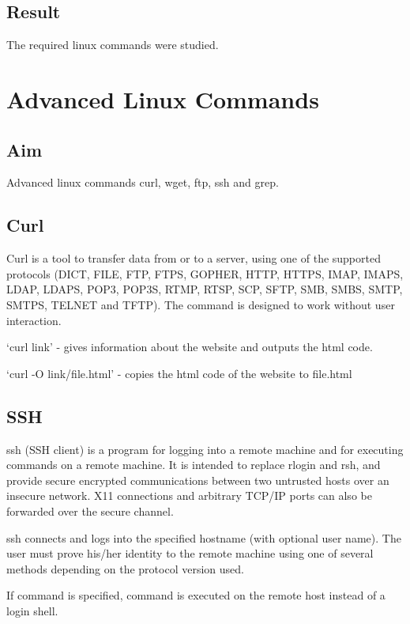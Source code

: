 \documentclass{article}
\begin{document}
\subsection {Result}

The required linux commands were studied.

\newpage
\section{Advanced Linux Commands}

\subsection{Aim}
Advanced linux commands curl, wget, ftp, ssh and grep.

\subsection{Curl}

Curl is a tool to transfer data from or to a server, using one of the supported protocols (DICT, FILE, FTP, FTPS, GOPHER, HTTP, HTTPS, IMAP, IMAPS, LDAP, LDAPS, POP3, POP3S, RTMP, RTSP, SCP, SFTP, SMB, SMBS, SMTP, SMTPS, TELNET and TFTP). The command is designed to work without user interaction.

`curl link' - gives information about the website and outputs the html code.

`curl -O link/file.html' - copies the html code of the website to file.html

\subsection{SSH}

     ssh (SSH client) is a program for logging into a remote machine and for
     executing commands on a remote machine.  It is intended to replace rlogin
     and rsh, and provide secure encrypted communications between two
     untrusted hosts over an insecure network.  X11 connections and arbitrary
     TCP/IP ports can also be forwarded over the secure channel.

     ssh connects and logs into the specified hostname (with optional user
     name).  The user must prove his/her identity to the remote machine using
     one of several methods depending on the protocol version used.

     If command is specified, command is executed on the remote host instead
     of a login shell.
    
\end{document}
